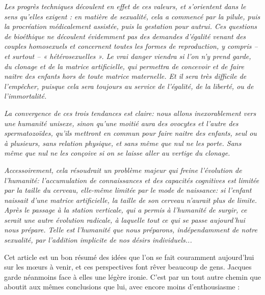 \begin{displayquote}
\emph{\quarto Les progrès techniques découlent en effet de ces valeurs, et s'orientent dans le sens qu'elles exigent : en matière de sexualité, cela a commencé par la pilule, puis la procréation médicalement assistée, puis la gestation pour autrui. Ces questions de bioéthique ne découlent évidemment pas des demandes d'égalité venant des couples homosexuels et concernent toutes les formes de reproduction, y compris -- et surtout -- « hétérosexuelles ». Le vrai danger viendra si l'on n'y prend garde, du clonage et de la matrice artificielle, qui permettra de concevoir et de faire naitre des enfants hors de toute matrice maternelle. Et il sera très difficile de l'empêcher, puisque cela sera toujours au service de l'égalité, de la liberté, ou de l'immortalité.}
 
\emph{ La convergence de ces trois tendances est claire: nous allons inexorablement vers une humanité unisexe, sinon qu'une moitié aura des ovocytes et l'autre des spermatozoïdes, qu'ils mettront en commun pour faire naitre des enfants, seul ou à plusieurs, sans relation physique, et sans même que nul ne les porte. Sans même que nul ne les conçoive si on se laisse aller au vertige du clonage.}
 
\emph{ Accessoirement, cela résoudrait un problème majeur qui freine l'évolution de l'humanité: l'accumulation de connaissances et des capacités cognitives est limitée par la taille du cerveau, elle-même limitée par le mode de naissance: si l'enfant naissait d'une matrice artificielle, la taille de son cerveau n'aurait plus de limite. Après le passage à la station verticale, qui a permis à l'humanité de surgir, ce serait une autre évolution radicale, à laquelle tout ce qui se passe aujourd'hui nous prépare. Telle est l'humanité que nous préparons, indépendamment de notre sexualité, par l'addition implicite de nos désirs individuels...}
\end{displayquote}


Cet article est un bon résumé des idées que l'on se fait couramment aujourd'hui sur les mœurs à venir, et ces perspectives font rêver beaucoup de gens. Jacques  garde néanmoins face à elles une légère ironie. C'est par un tout autre chemin que  aboutit aux mêmes conclusions que lui, avec encore moins d'enthousiasme  :

